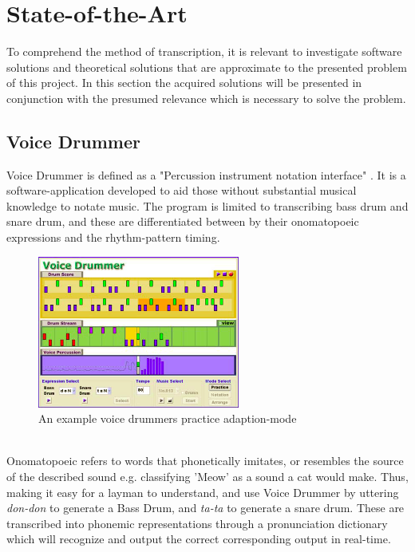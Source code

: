 \section{ State-of-the-Art }
To comprehend the method of transcription, it is relevant to investigate software solutions and theoretical solutions that are approximate to the presented problem of this project. In this section the acquired solutions will be presented in conjunction with the presumed relevance which is necessary to solve the problem.

\subsection{ Voice Drummer }
Voice Drummer is defined as a "Percussion instrument notation interface" \citep{VoiceDrummer}. It is a software-application developed to aid those without substantial musical knowledge to notate music. The program is limited to transcribing bass drum and snare drum, and these are differentiated between by their onomatopoeic expressions and the rhythm-pattern timing.
\\
\begin{figure}[h]
	\begin{center}
		\includegraphics[height=5cm]{fig/VoiceDrummer.png}
		\caption{An example voice drummers practice adaption-mode \citep{VoiceDrummer}}
		\label{VoiceDrummer}
	\end{center}
\end{figure}
\\
Onomatopoeic refers to words that phonetically imitates, or resembles the source of the described sound e.g. classifying 'Meow' as a sound a cat would make. Thus, making it easy for a layman to understand, and use Voice Drummer by uttering \textit{don-don} to generate a Bass Drum, and \textit{ta-ta} to generate a snare drum. These are transcribed into phonemic representations through a pronunciation dictionary which will recognize and
 output the correct corresponding output in real-time.

